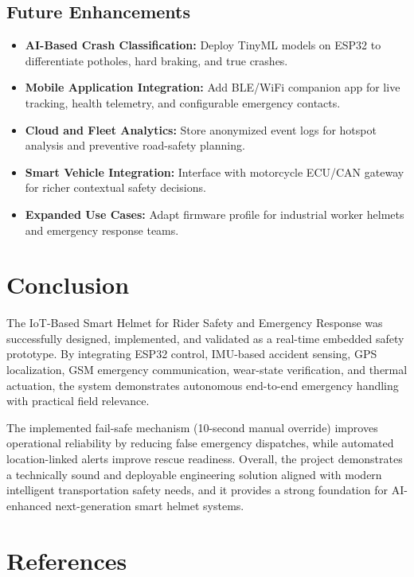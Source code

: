 \documentclass[10pt,a4paper]{article}
\begin{document}
\subsection*{Future Enhancements}
\begin{itemize}[leftmargin=1.5em]
  \item \textbf{AI-Based Crash Classification:} Deploy TinyML models on ESP32 to differentiate potholes, hard braking, and true crashes.
  \item \textbf{Mobile Application Integration:} Add BLE/WiFi companion app for live tracking, health telemetry, and configurable emergency contacts.
  \item \textbf{Cloud and Fleet Analytics:} Store anonymized event logs for hotspot analysis and preventive road-safety planning.
  \item \textbf{Smart Vehicle Integration:} Interface with motorcycle ECU/CAN gateway for richer contextual safety decisions.
  \item \textbf{Expanded Use Cases:} Adapt firmware profile for industrial worker helmets and emergency response teams.
\end{itemize}


\section{Conclusion}

The IoT-Based Smart Helmet for Rider Safety and Emergency Response was successfully designed, implemented, and validated as a real-time embedded safety prototype. By integrating ESP32 control, IMU-based accident sensing, GPS localization, GSM emergency communication, wear-state verification, and thermal actuation, the system demonstrates autonomous end-to-end emergency handling with practical field relevance.

The implemented fail-safe mechanism (10-second manual override) improves operational reliability by reducing false emergency dispatches, while automated location-linked alerts improve rescue readiness. Overall, the project demonstrates a technically sound and deployable engineering solution aligned with modern intelligent transportation safety needs, and it provides a strong foundation for AI-enhanced next-generation smart helmet systems.


\section*{References}
\end{document}
